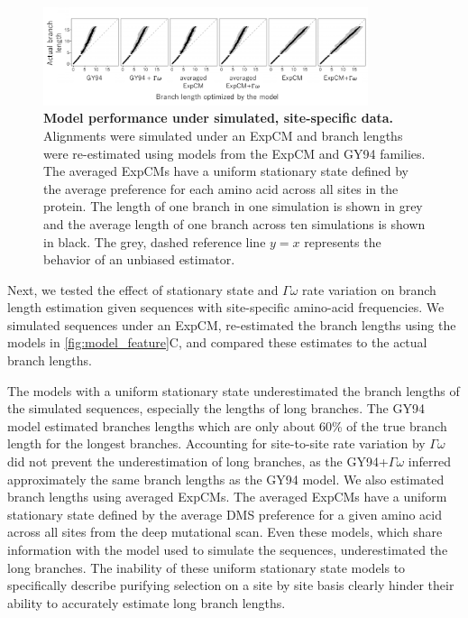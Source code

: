 \documentclass[11pt]{article}
\begin{document}
\begin{figure}[H]
\centerline{\includegraphics[width=0.85\textwidth]{figures/simulations}}
\caption{\label{fig:simulations}
\textbf{Model performance under simulated, site-specific data.} 
Alignments were simulated under an ExpCM and branch lengths were re-estimated using models from the ExpCM and GY94 families. 
The averaged ExpCMs have a uniform stationary state defined by the average preference for each amino acid across all sites in the protein. 
The length of one branch in one simulation is shown in grey and the average length of one branch across ten simulations is shown in black. 
The grey, dashed reference line $y=x$ represents the behavior of an unbiased estimator. 
}
\end{figure}

Next, we tested the effect of stationary state and $\Gamma\omega$ rate variation on branch length estimation given sequences with site-specific amino-acid frequencies. 
We simulated sequences under an ExpCM, re-estimated the branch lengths using the models in \ref{fig:model_feature}C, and compared these estimates to the actual branch lengths.

The models with a uniform stationary state underestimated the branch lengths of the simulated sequences, especially the lengths of long branches. 
The GY94 model estimated branches lengths which are only about 60\% of the true branch length for the longest branches. 
Accounting for site-to-site rate variation by $\Gamma\omega$ did not prevent the underestimation of long branches, as the GY94+$\Gamma\omega$ inferred approximately the same branch lengths as the GY94 model.
We also estimated branch lengths using averaged ExpCMs.
The averaged ExpCMs have a uniform stationary state defined by the average DMS preference for a given amino acid across all sites from the deep mutational scan. 
Even these models, which share information with the model used to simulate the sequences, underestimated the long branches. 
The inability of these uniform stationary state models to specifically describe purifying selection on a site by site basis clearly hinder their ability to accurately estimate long branch lengths. 
\end{document}
